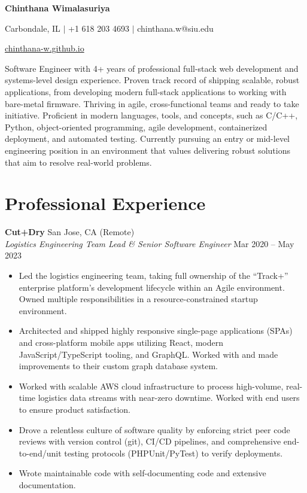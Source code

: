 \documentclass[letterpaper,10pt]{article}
\newcommand{\name}[1]{\centerline{\Huge\bfseries #1}}
\newcommand{\contact}[1]{\centerline{\small #1}}
\begin{document}
\name{Chinthana Wimalasuriya}
\vspace{4pt}
\contact{Carbondale, IL $|$ +1 618 203 4693 $|$ chinthana.w@siu.edu}
\contact{\href{https://chinthana-w.github.io/}{chinthana-w.github.io}}

\vspace{8pt}
\noindent
Software Engineer with 4+ years of professional full-stack web development and systems-level design experience. Proven track record of shipping scalable, robust applications, from developing modern full-stack applications to working with bare-metal firmware. Thriving in agile, cross-functional teams and ready to take initiative. Proficient in modern languages, tools, and concepts, such as C/C++, Python, object-oriented programming, agile development, containerized deployment, and automated testing. Currently pursuing an entry or mid-level engineering position in an environment that values delivering robust solutions that aim to resolve real-world problems.

\section{Professional Experience}

\noindent \textbf{Cut+Dry} \hfill San Jose, CA (Remote) \\
\textit{Logistics Engineering Team Lead \& Senior Software Engineer} \hfill Mar 2020 -- May 2023
\begin{itemize}
    \item Led the logistics engineering team, taking full ownership of the ``Track+'' enterprise platform's development lifecycle within an Agile environment. Owned multiple responsibilities in a resource-constrained startup environment.
    \item Architected and shipped highly responsive single-page applications (SPAs) and cross-platform mobile apps utilizing React, modern JavaScript/TypeScript tooling, and GraphQL. Worked with and made improvements to their custom graph database system.
    \item Worked with scalable AWS cloud infrastructure to process high-volume, real-time logistics data streams with near-zero downtime. Worked with end users to ensure product satisfaction.
    \item Drove a relentless culture of software quality by enforcing strict peer code reviews with version control (git), CI/CD pipelines, and comprehensive end-to-end/unit testing protocols (PHPUnit/PyTest) to verify deployments.
    \item Wrote maintainable code with self-documenting code and extensive documentation.
\end{itemize}
\end{document}
